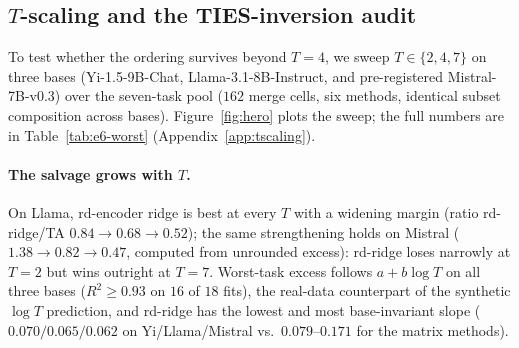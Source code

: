 \subsection{$T$-scaling and the TIES-inversion audit}
\label{subsec:exp-T-scaling}

To test whether the ordering survives beyond $T = 4$, we sweep
$T \in \{2, 4, 7\}$ on three bases (Yi-1.5-9B-Chat,
Llama-3.1-8B-Instruct, and pre-registered Mistral-7B-v0.3) over the
seven-task pool ($162$ merge cells, six methods, identical subset
composition across bases). Figure~\ref{fig:hero} plots the sweep; the
full numbers are in Table~\ref{tab:e6-worst}
(Appendix~\ref{app:tscaling}).

\paragraph{The salvage grows with $T$.} On Llama, rd-encoder ridge is
best at every $T$ with a widening margin (ratio rd-ridge/TA
$0.84 \to 0.68 \to 0.52$); the same strengthening holds on Mistral
($1.38 \to 0.82 \to 0.47$, computed from unrounded excess): rd-ridge
loses narrowly at $T = 2$ but wins outright at $T = 7$. Worst-task
excess follows $a + b\log T$ on all three bases ($R^2 \geq 0.93$ on
$16$ of $18$ fits), the real-data counterpart of the synthetic
$\log T$ prediction, and rd-ridge has the lowest and most
base-invariant slope ($0.070/0.065/0.062$ on Yi/Llama/Mistral vs.\
$0.079$--$0.171$ for the matrix methods).

